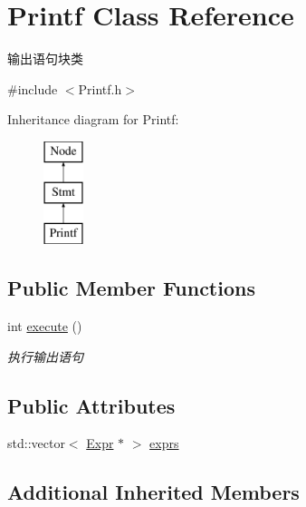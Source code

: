 \hypertarget{class_printf}{}\section{Printf Class Reference}
\label{class_printf}


输出语句块类  




{\ttfamily \#include $<$Printf.\+h$>$}

Inheritance diagram for Printf\+:\begin{figure}[H]
\begin{center}
\leavevmode
\includegraphics[height=3.000000cm]{class_printf}
\end{center}
\end{figure}
\subsection*{Public Member Functions}
\begin{DoxyCompactItemize}
\item 
\mbox{\label{class_printf_a0343199e28647ced40b9d74a284ff5f3}} 
int \hyperlink{class_printf_a0343199e28647ced40b9d74a284ff5f3}{execute} ()
\begin{DoxyCompactList}\small\item\em 执行输出语句 \end{DoxyCompactList}\end{DoxyCompactItemize}
\subsection*{Public Attributes}
\begin{DoxyCompactItemize}
\item 
std\+::vector$<$ \hyperlink{class_expr}{Expr} $\ast$ $>$ \hyperlink{class_printf_ab07a181eb9cd79c9018e172332d44ce5}{exprs}
\end{DoxyCompactItemize}
\subsection*{Additional Inherited Members}


